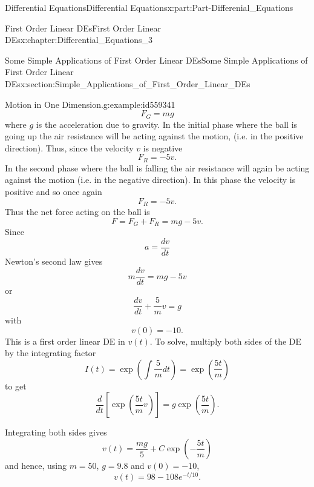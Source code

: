 \documentclass[oneside,10pt,]{book}
\numberwithin{equation}{section}
\begin{document}
\begin{partptx}{Differential Equations}{}{Differential Equations}{}{}{x:part:Part-Differenial_Equations}
\begin{chapterptx}{First Order Linear DEs}{}{First Order Linear DEs}{}{}{x:chapter:Differential_Equations_3}
\begin{sectionptx}{Some Simple Applications of First Order Linear DEs}{}{Some Simple Applications of First Order Linear DEs}{}{}{x:section:Simple_Applications_of_First_Order_Linear_DEs}
\begin{example}{Motion in One Dimension.}{g:example:id559341}
\begin{equation*}
F_G = mg
\end{equation*}
where \(g\) is the acceleration due to gravity. In the initial phase where the ball is going up the air resistance will be acting against the motion, (i.e. in the positive direction). Thus, since the velocity \(v\) is negative%
\begin{equation*}
F_R = -5v\text{.}
\end{equation*}
In the second phase where the ball is falling the air resistance will again be acting against the motion (i.e. in the negative direction). In this phase the velocity is positive and so once again%
\begin{equation*}
F_R = -5v\text{.}
\end{equation*}
Thus the net force acting on the ball is%
\begin{equation*}
F = F_G + F_R = mg-5v\text{.}
\end{equation*}
Since%
\begin{equation*}
a = \dfrac{dv}{dt}
\end{equation*}
Newton's second law gives%
\begin{equation*}
m \dfrac{dv}{dt} = mg - 5v
\end{equation*}
or%
\begin{equation*}
\dfrac{dv}{dt} + \dfrac{5}{m} v = g
\end{equation*}
with%
\begin{equation*}
v(0) = -10\text{.}
\end{equation*}
This is a first order linear DE in \(v(t)\). To solve, multiply both sides of the DE by the integrating factor%
\begin{equation*}
I(t) = \exp \left( \displaystyle \int \frac{5}{m} dt \right) = \exp \left( \frac{5t}{m} \right)
\end{equation*}
to get%
\begin{equation*}
\dfrac{d}{dt} \left[ \exp \left( \frac{5t}{m} v \right) \right] = g \exp \left( \frac{5t}{m} \right)\text{.}
\end{equation*}
%
\par
Integrating both sides gives%
\begin{equation*}
v(t) = \frac{mg}{5} + C \exp \left(-\frac{5t}{m} \right)
\end{equation*}
and hence, using \(m=50\), \(g=9.8\) and \(v(0) = -10\),%
\begin{equation*}
v(t) = 98 - 108 e^{-t/10}\text{.}
\end{equation*}
%
\par

\end{example}
\end{sectionptx}
\end{chapterptx}
\end{partptx}
\end{document}
